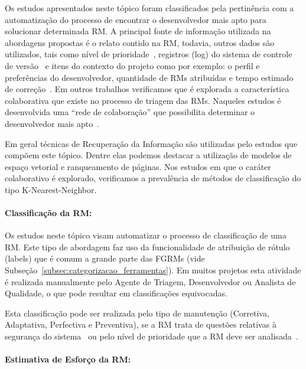 Os estudos apresentados neste tópico foram classificados pela pertinência com a
automatização do processo de encontrar o desenvolvedor mais apto para solucionar
determinada RM\@. A principal fonte de informação utilizada na abordagens
propostas é o relato contido na RM, todavia, outros dados são utilizados, tais
como nível de prioridade~\cite{tian2015automated}, registros (log) do sistema de
controle de versão~\cite{shokripour2012automatic, Hu:2014:EBT:2707683.2708297} e
itens do contexto do projeto como por exemplo: o perfil e preferências do
desenvolvedor, quantidade de RMs atribuídas e tempo estimado de
correção~\cite{hosseini2012market}. Em outros trabalhos verificamos que é
explorada a característica colaborativa que existe no processo de triagem das
RMs. Naqueles estudos é desenvolvida uma ``rede de colaboração'' que possibilita
determinar o desenvolvedor mais apto~\cite{Zhang2014,Zanetti2013, Wu2011}.

Em geral técnicas de Recuperação da Informação são utilizadas pelo estudos que
compõem este tópico. Dentre elas podemos destacar a utilização de modelos de
espaço vetorial e ranqueamento de páginas. Nos estudos em que o caráter
colaborativo é explorado, verificamos a prevalência de métodos de classificação
do tipo K-Nearest-Neighbor.

\paragraph{Classificação da RM:}

Os estudos neste tópico visam automatizar o processo de clas\-si\-fi\-ca\-ção de
uma RM\@.  Este tipo de abordagem faz uso da funcionalidade de atribuição de
rótulo (labels) que é comum  a grande parte das FGRMs (vide
Subseção~\ref{subsec:categorizacao_ferramentas}). Em muitos projetos esta
atividade é realizada manualmente pelo Agente de Triagem, Desenvolvedor ou
Analista de Qualidade, o que pode resultar em classificações equivocadas.

Esta classificação pode ser realizada pelo tipo de manutenção (Corretiva,
Adaptativa, Perfectiva e Preventiva), se a RM trata de questões relativas à
segurança do sistema~\cite{gegick2010identifying, behl2014bug} ou pelo nível de
prioridade que a RM deve ser analisada~\cite{behl2014bug}.

\paragraph{Estimativa de Esforço da RM:}

